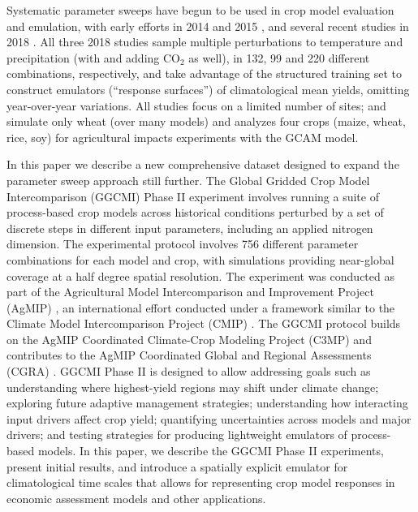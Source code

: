 \documentclass[esd, manuscript]{copernicus} %
\begin{document}
Systematic parameter sweeps have begun to be used in crop model evaluation and emulation, with early efforts in 2014 and 2015 \citep{ruane2014, Markowski2015, Pirttioja2015}, and several recent studies in 2018 \citep{FRONZEK20182, Snyder2018, RUIZRAMOS2018}. All three 2018 studies sample multiple perturbations to temperature and precipitation (with \citet{Snyder2018} and \citet{RUIZRAMOS2018} adding CO$_2$ as well), in 132, 99 and 220 different combinations, respectively, and take advantage of the structured training set to construct emulators (``response surfaces'') of climatological mean yields, omitting year-over-year variations. All studies focus on a limited number of sites; \citet{FRONZEK20182} and \citet{RUIZRAMOS2018} simulate only wheat (over many models) and \citet{Snyder2018} analyzes four crops (maize, wheat, rice, soy) for agricultural impacts experiments with the GCAM \citep{calvin2019} model.

In this paper we describe a new comprehensive dataset designed to expand the parameter sweep approach still further. The Global Gridded Crop Model Intercomparison (GGCMI) Phase II experiment involves running a suite of process-based crop models across historical conditions perturbed by a set of discrete steps in different input parameters, including an applied nitrogen dimension. The experimental protocol involves 756 different parameter combinations for each model and crop, with simulations providing near-global coverage at a half degree spatial resolution. The experiment was conducted as part of the Agricultural Model Intercomparison and Improvement Project (AgMIP) \citep{ROSENZWEIG2013, Rosenzweig2014}, an international effort conducted under a framework similar to the Climate Model Intercomparison Project (CMIP) \citep{Taylor2012, Eyring2016}. The GGCMI protocol builds on the AgMIP Coordinated Climate-Crop Modeling Project (C3MP) \citep{ruane2014, mcdermid2015} and contributes to the AgMIP Coordinated Global and Regional Assessments (CGRA) \citep{ruane2018, rosenzweig2018}. GGCMI Phase II is designed to allow addressing goals such as understanding where highest-yield regions may shift under climate change; exploring future adaptive management strategies; understanding how interacting input drivers affect crop yield; quantifying uncertainties across models and major drivers; and testing strategies for producing lightweight emulators of process-based models. In this paper, we describe the GGCMI Phase II experiments, present initial results, and introduce a spatially explicit emulator for climatological time scales that allows for representing crop model responses in economic assessment models and other applications.
\end{document}
